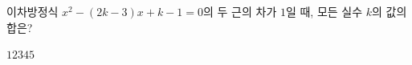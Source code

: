 이차방정식 $x^2-(2k-3)x+k-1=0$의 두 근의 차가 $1$일 때, 모든 실수 $k$의 값의 합은?
\begin{choices32}{$1$}{$2$}{$3$}{$4$}{$5$}\end{choices32}
